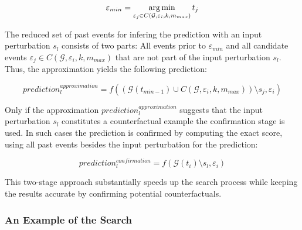 \begin{equation}
    \varepsilon_{min} = \operatorname*{arg\,min}_{\varepsilon_j \in C(\mathcal{G}, \varepsilon_i, k, m_{max})} t_j
\end{equation}

The reduced set of past events for infering the prediction with an input perturbation $s_l$ consists of two parts: All events prior to $\varepsilon_{min}$ and all candidate events $\varepsilon_j \in C(\mathcal{G}, \varepsilon_i, k, m_{max})$ that are not part of the input perturbation $s_l$. Thus, the approximation yields the following prediction:

\begin{equation}
    prediction_l^{approximation} = f((\mathcal{G}(t_{min - 1}) \cup C(\mathcal{G}, \varepsilon_i, k, m_{max})) \setminus s_j, \varepsilon_i)
\end{equation}

Only if the approximation $prediction_l^{approximation}$ suggests that the input perturbation $s_l$ constitutes a counterfactual example the confirmation stage is used. In such cases the prediction is confirmed by computing the exact score, using all past events besides the input perturbation for the prediction:

\begin{equation}
    prediction_l^{confirmation} = f(\mathcal{G}(t_i) \setminus s_l, \varepsilon_i)
\end{equation}

This two-stage approach substantially speeds up the search process while keeping the results accurate by confirming potential counterfactuals.

\subsubsection{An Example of the Search}
\label{s_Methodology_Search_Example}

